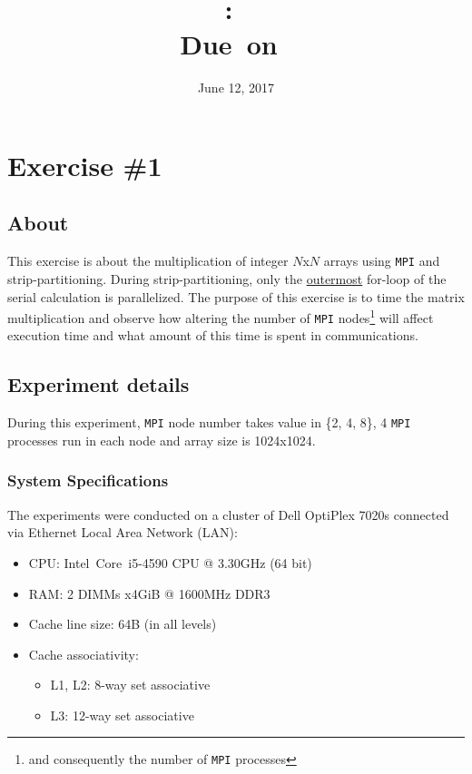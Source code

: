 \documentclass{article}
\title{
\vspace{2in}
\textmd{\textbf{\hmwkClass:\ \hmwkTitle}}\\
\normalsize\vspace{0.1in}\small{Due\ on\ \hmwkDueDate}\\
\vspace{0.1in}\large{\textit{\hmwkClassInstructor}}
\vspace{3in}
}
\author{\textbf{\hmwkAuthorName}}
\date{June 12, 2017} %
\begin{document}
\maketitle


\newpage
\tableofcontents
\newpage



\section{Exercise \#1}

\subsection{About}
This exercise is about the multiplication of integer $N$x$N$ arrays using \texttt{MPI} and
strip-partitioning. During strip-partitioning, only the \underline{outermost} for-loop of
the serial calculation is parallelized. The purpose of this exercise is to time the matrix
multiplication and observe how altering the number of \texttt{MPI} nodes\footnote{and
consequently the number of \texttt{MPI} processes} will affect execution time and what
amount of this time is spent in communications.

\subsection{Experiment details}
During this experiment, \texttt{MPI} node number takes value in \{2, 4, 8\}, 4 \texttt{MPI}
processes run in each node and array size is 1024x1024.

\subsubsection{System Specifications}
The experiments were conducted on a cluster of Dell OptiPlex 7020s connected via Ethernet
Local Area Network (LAN):
\begin{itemize}
 \item CPU: Intel\textregistered \ Core\texttrademark \ i5-4590 CPU @ 3.30GHz (64 bit)
 \item RAM: 2 DIMMs x4GiB @ 1600MHz DDR3
 \item Cache line size: 64B (in all levels)
 \item Cache associativity:
 \begin{itemize}
  \item L1, L2: 8-way set associative
  \item L3: 12-way set associative
 \end{itemize}
\end{itemize}
\end{document}
